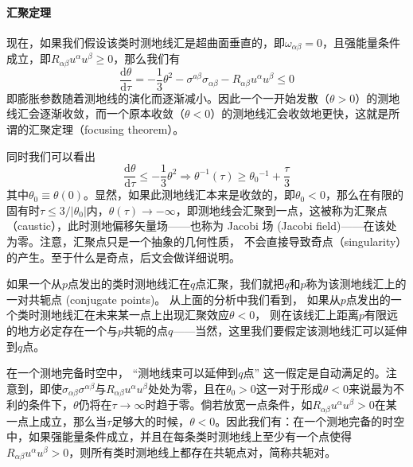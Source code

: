 \documentclass[hyperref, UTF8, a4paper]{ctexart}
\begin{document}
\paragraph{汇聚定理}

现在，如果我们假设该类时测地线汇是超曲面垂直的，即$\omega _{\alpha \beta } =0$，且强能量条件成立，即$R_{\alpha \beta } u^{\alpha } u^{\beta } \geq 0$，那么我们有
\begin{equation*}
	\frac{\mathrm{d} \theta }{\mathrm{d} \tau } =-\frac{1}{3} \theta ^{2} -\sigma ^{a\beta } \sigma _{\alpha \beta } -R_{\alpha \beta } u^{\alpha } u^{\beta } \leq 0
\end{equation*}
即膨胀参数随着测地线的演化而逐渐减小。因此一个一开始发散（$\theta  >0$）的测地线汇会逐渐收敛，而一个原本收敛（$\theta < 0$）的测地线汇会收敛地更快，这就是所谓的汇聚定理（focusing theorem）。

同时我们可以看出
\begin{equation*}
	\frac{\mathrm{d} \theta }{\mathrm{d} \tau } \leq -\frac{1}{3} \theta ^{2} \Rightarrow \theta ^{-1}( \tau ) \geq \theta {_{0}}^{-1} +\frac{\tau }{3}
\end{equation*}
其中$\theta _{0} \equiv \theta ( 0)$。显然，如果此测地线汇本来是收敛的，即$\theta _{0} < 0$，那么在有限的固有时$\tau \leq 3/| \theta _{0}| $内，$\theta ( \tau )\rightarrow -\infty $，即测地线会汇聚到一点，这被称为汇聚点（caustic），此时测地偏移矢量场——也称为 Jacobi 场 (Jacobi field)——在该处为零。注意，汇聚点只是一个抽象的几何性质， 不会直接导致奇点（singularity）的产生。至于什么是奇点，后文会做详细说明。



如果一个从$p$点发出的类时测地线汇在$q$点汇聚，我们就把$q$和$p$称为该测地线汇上的一对共轭点 (conjugate points)。 从上面的分析中我们看到， 如果从$p$点发出的一个类时测地线汇在未来某一点上出现汇聚效应$\theta < 0$， 则在该线汇上距离$p$有限远的地方必定存在一个与$p$共轭的点$q$——当然，这里我们要假定该测地线汇可以延伸到$q$点。



在一个测地完备时空中， “测地线束可以延伸到$q$点” 这一假定是自动满足的。注意到，即使$\sigma _{\alpha \beta } \sigma ^{\alpha \beta }$与$R_{\alpha \beta } u^{\alpha } u^{\beta }$处处为零，且在$\theta _{0}  >0$这一对于形成$\theta < 0$来说最为不利的条件下，$\theta $仍将在$\tau \rightarrow \infty $时趋于零。倘若放宽一点条件，如$R_{\alpha \beta } u^{\alpha } u^{\beta }  >0$在某一点上成立，那么当$\tau $足够大的时候，$\theta < 0$。因此我们有：在一个测地完备的时空中，如果强能量条件成立，并且在每条类时测地线上至少有一个点使得$R_{\alpha \beta } u^{\alpha } u^{\beta }  >0$，则所有类时测地线上都存在共轭点对，简称共轭对。 
\end{document}
